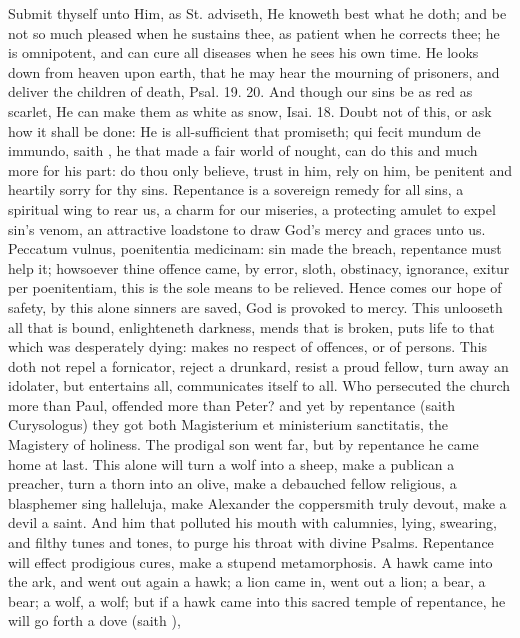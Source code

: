 {Submit thyself unto Him, as St. \Austin{} adviseth, He knoweth best
what he doth; and be not so much pleased when he sustains thee, as
patient when he corrects thee; he is omnipotent, and can cure all
diseases when he sees his own time. He looks down from heaven upon
earth, that he may hear the mourning of prisoners, and deliver the
children of death, Psal.  19. 20. And though our sins be as red as
scarlet, He can make them as white as snow, Isai.  18. Doubt not of
this, or ask how it shall be done: He is all-sufficient that promiseth;
qui fecit mundum de immundo, saith \Chrysostom{}, he that made a fair
world of nought, can do this and much more for his part: do thou only
believe, trust in him, rely on him, be penitent and heartily sorry for
thy sins. Repentance is a sovereign remedy for all sins, a spiritual
wing to rear us, a charm for our miseries, a protecting amulet to expel
sin's venom, an attractive loadstone to draw God's mercy and graces
unto us. Peccatum vulnus, poenitentia medicinam: sin made the
breach, repentance must help it; howsoever thine offence came, by
error, sloth, obstinacy, ignorance, exitur per poenitentiam, this is
the sole means to be relieved. Hence comes our hope of safety, by
this alone sinners are saved, God is provoked to mercy. This unlooseth
all that is bound, enlighteneth darkness, mends that is broken, puts
life to that which was desperately dying: makes no respect of offences,
or of persons. This doth not repel a fornicator, reject a
drunkard, resist a proud fellow, turn away an idolater, but entertains
all, communicates itself to all. Who persecuted the church more than
Paul, offended more than Peter? and yet by repentance (saith
Curysologus) they got both Magisterium et ministerium sanctitatis, the
Magistery of holiness. The prodigal son went far, but by repentance he
came home at last. This alone will turn a wolf into a sheep, make
a publican a preacher, turn a thorn into an olive, make a debauched
fellow religious, a blasphemer sing halleluja, make Alexander the
coppersmith truly devout, make a devil a saint. And him that
polluted his mouth with calumnies, lying, swearing, and filthy tunes
and tones, to purge his throat with divine Psalms. Repentance will
effect prodigious cures, make a stupend metamorphosis. A hawk came into
the ark, and went out again a hawk; a lion came in, went out a lion; a
bear, a bear; a wolf, a wolf; but if a hawk came into this sacred
temple of repentance, he will go forth a dove (saith \Chrysostom{}),
}
